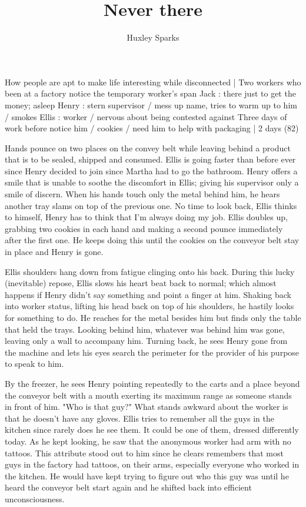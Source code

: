 \title{Never there}
\author{Huxley Sparks}
\begin{Outline}
        How people are apt to make life interesting while disconnected | Two workers who been at a factory notice the temporary worker's span
            Jack : there just to get the money; asleep
            Henry : stern supervisor / mess up name, tries to warm up to him / smokes
            Ellis : worker / nervous about being contested against
        Three days of work before notice him / cookies / need him to help with packaging | 2 days (82)
\end{Outline}
\begin{Document}
        Hands pounce on two places on the convey belt while leaving behind a product that is to be sealed, shipped and consumed. Ellis is going faster than before
    ever since Henry decided to join since Martha had to go the bathroom. Henry offers a smile that is unable to soothe the discomfort in Ellis; giving his
    supervisor only a smile of discern. When his hands touch only the metal behind him, he hears another tray slams on top of the previous one. No time to
    look back, Ellis thinks to himself, Henry has to think that I'm always doing my job. Ellis doubles up, grabbing two cookies in each hand and making a second
    pounce immediately after the first one. He keeps doing this until the cookies on the conveyor belt stay in place and Henry is gone.

        Ellis shoulders hang down from fatigue clinging onto his back. During this lucky (inevitable) repose, Ellis slows his heart beat back to normal; which
    almost happens if Henry didn't say something and point a finger at him. Shaking back into worker status, lifting his head back on top of his shoulders,
    he hastily looks for something to do. He reaches for the metal besides him but finds only the table that held the trays. Looking behind him, whatever was
    behind him was gone, leaving only a wall to accompany him. Turning back, he sees Henry gone from the machine and lets his eyes search the perimeter for
    the provider of his purpose to speak to him.

        By the freezer, he sees Henry pointing repeatedly to the carts and a place beyond the conveyor belt with a mouth exerting its maximum range as someone 
    stands in front of him. "Who is that guy?" What stands awkward about the worker is that he doesn't have any gloves. Ellis tries to remember all the guys
    in the kitchen since rarely does he see them. It could be one of them, dressed differently today. As he kept looking, he saw that the anonymous worker had
    arm with no tattoos. This attribute stood out to him since he clears remembers that most guys in the factory had tattoos, on their arms, especially everyone
    who worked in the kitchen. He would have kept trying to figure out who this guy was until he heard the conveyor belt start again and he shifted back into
    efficient unconsciousness.


\end{Document}
